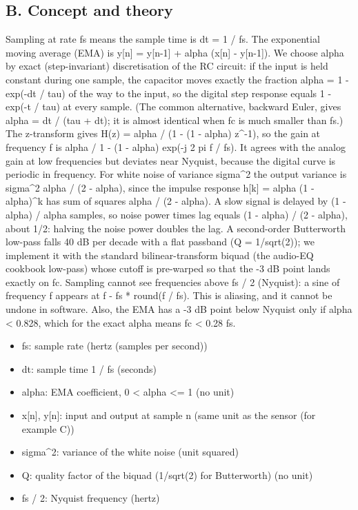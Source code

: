 \documentclass[11pt,a4paper]{article}
\begin{document}
\subsection*{B. Concept and theory}
Sampling at rate fs means the sample time is dt = 1 / fs. The exponential moving average (EMA) is y[n] = y[n-1] + alpha (x[n] - y[n-1]). We choose alpha by exact (step-invariant) discretisation of the RC circuit: if the input is held constant during one sample, the capacitor moves exactly the fraction alpha = 1 - exp(-dt / tau) of the way to the input, so the digital step response equals 1 - exp(-t / tau) at every sample. (The common alternative, backward Euler, gives alpha = dt / (tau + dt); it is almost identical when fc is much smaller than fs.) The z-transform gives H(z) = alpha / (1 - (1 - alpha) z\textasciicircum{}-1), so the gain at frequency f is alpha / \textbar{}1 - (1 - alpha) exp(-j 2 pi f / fs)\textbar{}. It agrees with the analog gain at low frequencies but deviates near Nyquist, because the digital curve is periodic in frequency. For white noise of variance sigma\textasciicircum{}2 the output variance is sigma\textasciicircum{}2 alpha / (2 - alpha), since the impulse response h[k] = alpha (1 - alpha)\textasciicircum{}k has sum of squares alpha / (2 - alpha). A slow signal is delayed by (1 - alpha) / alpha samples, so noise power times lag equals (1 - alpha) / (2 - alpha), about 1/2: halving the noise power doubles the lag. A second-order Butterworth low-pass falls 40 dB per decade with a flat passband (Q = 1/sqrt(2)); we implement it with the standard bilinear-transform biquad (the audio-EQ cookbook low-pass) whose cutoff is pre-warped so that the -3 dB point lands exactly on fc. Sampling cannot see frequencies above fs / 2 (Nyquist): a sine of frequency f appears at \textbar{}f - fs * round(f / fs)\textbar{}. This is aliasing, and it cannot be undone in software. Also, the EMA has a -3 dB point below Nyquist only if alpha \textless{} 0.828, which for the exact alpha means fc \textless{} 0.28 fs.

\begin{itemize}[nosep]
\item fs: sample rate (hertz (samples per second))
\item dt: sample time 1 / fs (seconds)
\item alpha: EMA coefficient, 0 \textless{} alpha \textless{}= 1 (no unit)
\item x[n], y[n]: input and output at sample n (same unit as the sensor (for example C))
\item sigma\textasciicircum{}2: variance of the white noise (unit squared)
\item Q: quality factor of the biquad (1/sqrt(2) for Butterworth) (no unit)
\item fs / 2: Nyquist frequency (hertz)
\end{itemize}
\end{document}
